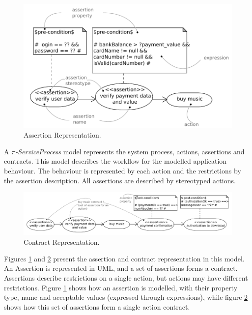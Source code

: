 
 

 
 
%  
  \begin{figure}[ht!]
\centering
\includegraphics[width=.8\textwidth]{chapters/methodology/figs/assertion_detail.pdf}
\caption{Assertion Representation.}
\label{fig:assertion_representation}
\end{figure}
 
 
 A \textit{$\pi$-ServiceProcess} model represents the system process,
 actions, assertions and contracts. This model describes the workflow for the modelled application
 behaviour. The behaviour is represented by each action and the restrictions by
 the assertion description. All assertions are described by stereotyped actions.
 
  
 
   \begin{figure}[ht!]
\centering
\includegraphics[width=.99\textwidth]{chapters/methodology/figs/contract_detail.pdf}
\caption{Contract Representation.}
\label{fig:contract_representation}
\end{figure}

Figures \ref{fig:assertion_representation} and \ref{fig:contract_representation}
present the assertion and contract representation in this
model. An Assertion is represented in UML, and a set of assertions forms a
contract. Assertions describe restrictions on a single action, but actions may
have different restrictions. Figure \ref{fig:assertion_representation} shows how an assertion is modelled, with their property type, name and acceptable values (expressed through
expressions), while figure \ref{fig:contract_representation} shows how this set
of assertions form a single action contract.     

